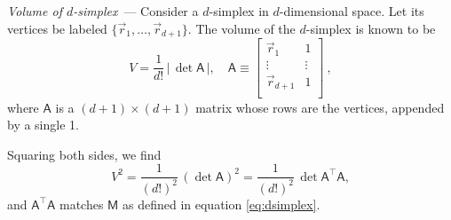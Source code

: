 \documentclass[10pt]{article}
\renewcommand{\paragraph}[1]{\par\addvspace{1em}\noindent\textsl{#1}~---}
\newcommand{\abs}[1]{|\,{#1}\,|}
\begin{document}
\paragraph{Volume of $d$-simplex} Consider a $d$-simplex in $d$-dimensional space. Let its vertices be labeled $\{ \vec{r}_1, \dots, \vec{r}_{d+1} \}$. The volume of the $d$-simplex is known to be
\begin{equation}
    V = \frac{1}{d!} \, \abs{\det \mathsf{A}},
    \quad \mathsf{A} \equiv \left[ \begin{array}{cc}
        \vec{r}_1 & 1 \\
        \vdots & \vdots \\
        \vec{r}_{d+1} & 1 \\
    \end{array} \right]~,
\end{equation}
where $\mathsf{A}$ is a $(d+1) \times (d+1)$ matrix whose rows are the vertices, appended by a single 1.

Squaring both sides, we find
\begin{equation}
    V^2
    = \frac{1}{(d!)^2} \, (\det \mathsf{A})^2
    = \frac{1}{(d!)^2} \, \det \mathsf{A}^\top \mathsf{A},
\end{equation}
and $\mathsf{A}^\top \mathsf{A}$ matches $\mathsf{M}$ as defined in equation \eqref{eq:dsimplex}.
\end{document}
